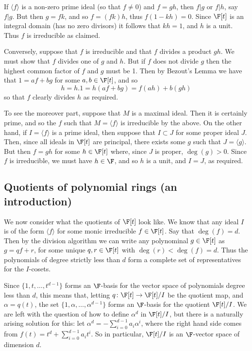 \documentclass{maths}
\begin{document}
\begin{prf}
    If $\langle f\rangle$ is a non-zero prime ideal (so that $f\neq0$) and $f=gh$, then $f|g$ or $f|h$, say $f|g$.
    But then $g=fk$, and so $f=(fk)h$, thus $f(1-kh)=0$.
    Since $\F[t]$ is an integral domain (has no zero divisors) it follows that $kh=1$, and $h$ is a unit.
    Thus $f$ is irreducible as claimed.

    Conversely, suppose that $f$ is irreducible and that $f$ divides a product $gh$.
    We must show that $f$ divides one of $g$ and $h$.
    But if $f$ does not divide $g$ then the highest common factor of $f$ and $g$ must be 1.
    Then by Bezout's Lemma we have that $1=af+bg$ for some $a,b\in\F[t]$, and so
    \[
        h =
        h.1 =
        h(af+bg) =
        f(ah) + b(gh)
    \]
    so that $f$ clearly divides $h$ as required.

    To see the moreover part, suppose that $M$ is a maximal ideal.
    Then it is certainly prime, and so the $f$ such that $M=\langle f\rangle$ is irreducible by the above.
    On the other hand, if $I=\langle f\rangle$ is a prime ideal, then suppose that $I\subset J$ for some proper ideal $J$.
    Then, since all ideals in $\F[t]$ are principal, there exists some $g$ such that $J=\langle g\rangle$.
    But then $f=gh$ for some $h\in\F[t]$ where, since $J$ is proper, $\deg(g)>0$.
    Since $f$ is irreducible, we must have $h\in\F$, and so $h$ is a unit, and $I=J$, as required.
\end{prf}

\subsection{Quotients of polynomial rings (an introduction)}

We now consider what the quotients of $\F[t]$ look like.
We know that any ideal $I$ is of the form $\langle f\rangle$ for some monic irreducible $f\in\F[t]$.
Say that $\deg(f)=d$.
Then by the division algorithm we can write any polynominal $g\in\F[t]$ as $g=qf+r$, for some unique $q,r\in\F[t]$ with $\deg(r)<\deg(f)=d$.
Thus the polynomials of degree strictly less than $d$ form a complete set of representatives for the $I$-cosets.

Since $\{1,t,\ldots,t^{d-1}\}$ forms an $\F$-basis for the vector space of polynomials degree less than $d$, this means that, letting $q\colon\F[t]\to\F[t]/I$ be the quotient map, and $\alpha=q(t)$, the set $\{1,\alpha,\ldots,\alpha^{d-1}\}$ forms an $\F$-basis for the quotient $\F[t]/I$.
We are left with the question of how to define $\alpha^d$ in $\F[t]/I$, but there is a naturally arising solution for this: let $\alpha^d=-\sum_{i=0}^{d-1}a_i\alpha^i$, where the right hand side comes from $f(t)=t^d+\sum_{i=0}^{d-1}a_i t^i$.
So in particular, $\F[t]/I$ is an $\F$-vector space of dimension $d$.
\end{document}
